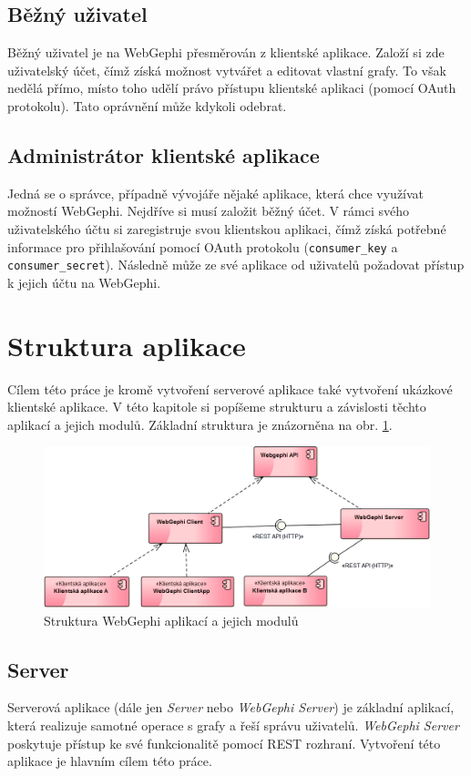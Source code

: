 \documentclass[thesis=M,czech]{FITthesis}[2014/05/6]
\begin{document}
\subsection{Běžný uživatel}
Běžný uživatel je na WebGephi přesměrován z klientské aplikace. Založí si zde uživatelský účet, čímž získá možnost vytvářet a editovat vlastní grafy. To však nedělá přímo,
místo toho udělí právo přístupu klientské aplikaci (pomocí OAuth protokolu). Tato oprávnění může kdykoli odebrat.

\subsection{Administrátor klientské aplikace}
Jedná se o správce, případně vývojáře nějaké aplikace, která chce využívat možností WebGephi. Nejdříve si musí založit běžný účet. V rámci svého
uživatelského účtu si zaregistruje svou klientskou aplikaci, čímž získá potřebné informace pro přihlašování pomocí OAuth protokolu (\texttt{consumer\_key} a \texttt{consumer\_secret}).
Následně může ze své aplikace od uživatelů požadovat přístup k jejich účtu na WebGephi.

\section{Struktura aplikace}
Cílem této práce je kromě vytvoření serverové aplikace také vytvoření ukázkové klientské aplikace. V této kapitole si popíšeme strukturu a
závislosti těchto aplikací a jejich modulů. Základní struktura je znázorněna na obr. \ref{fig:modules}.

\begin{figure}\centering
 	\includegraphics[width=1\textwidth]{images/diagram/modules}
 	\caption[Struktura WebGephi modulů]{Struktura WebGephi aplikací a jejich modulů}\label{fig:modules}
\end{figure}


\subsection{Server}
Serverová aplikace (dále jen \textit{Server} nebo \textit{WebGephi Server}) je základní aplikací, která realizuje samotné operace s grafy a řeší správu uživatelů.
\textit{WebGephi Server} poskytuje přístup ke své funkcionalitě pomocí REST rozhraní. Vytvoření této aplikace je hlavním cílem této práce.
\end{document}
